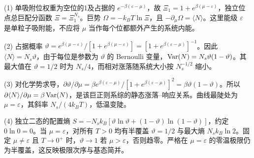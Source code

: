 (1) 单吸附位权重为空位的1及占据的 \(e^{-\beta(\varepsilon-\mu)}\)，故 \(\Xi_1=1+e^{\beta(\mu-\varepsilon)}\)，独立位点总巨配分函数 \(\Xi=\Xi_1^{N_s}\)。巨势 \(\Omega=-k_BT\ln\Xi\)，且 \(-\partial_\mu\Omega=\langle N\rangle\)。这里能级 \(\varepsilon\) 是单粒子吸附能，不应将 \(\mu\) 当作每个位都额外产生的系统内能。

(2) 占据概率 \(\vartheta=e^{\beta(\mu-\varepsilon)}/[1+e^{\beta(\mu-\varepsilon)}]=[1+e^{\beta(\varepsilon-\mu)}]^{-1}\)。因此 \(\langle N\rangle=N_s\vartheta\)，由于每位是参数为 \(\vartheta\) 的 Bernoulli 变量，\({\rm Var}(N)=N_s\vartheta(1-\vartheta)\)。其最大值在 \(\vartheta=1/2\) 时为 \(N_s/4\)，而相对涨落随系统大小按 \(N_s^{-1/2}\) 缩小。

(3) 对化学势求导，\(\partial\vartheta/\partial\mu=\beta e^{\beta(\varepsilon-\mu)}/[1+e^{\beta(\varepsilon-\mu)}]^2=\beta\vartheta(1-\vartheta)\)。所以 \(\partial\langle N\rangle/\partial\mu=\beta\,{\rm Var}(N)\)，是该巨正则系综的静态涨落--响应关系。曲线最陡处为 \(\mu=\varepsilon\)，其斜率 \(N_s/(4k_BT)\)，低温变陡。

(4) 独立二态的配置熵 \(S=-N_sk_B[\vartheta\ln\vartheta+(1-\vartheta)\ln(1-\vartheta)]\)，约定 \(0\ln0=0\)。当 \(\mu=\varepsilon\)，对所有 \(T>0\) 均有半覆盖 \(\vartheta=1/2\) 与最大熵 \(N_sk_B\ln2\)。固定 \(\mu\ne\varepsilon\) 且 \(T\to0^+\) 时，\(\vartheta\to1\) 若 \(\mu>\varepsilon\)，否则趋零。严格在 \(\mu=\varepsilon\) 的零温极限仍为半覆盖，这反映极限次序与基态简并。
